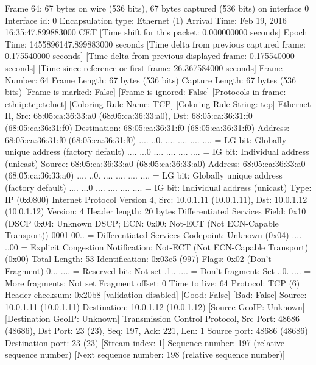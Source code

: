 Frame 64: 67 bytes on wire (536 bits), 67 bytes captured (536 bits) on interface 0
    Interface id: 0
    Encapsulation type: Ethernet (1)
    Arrival Time: Feb 19, 2016 16:35:47.899883000 CET
    [Time shift for this packet: 0.000000000 seconds]
    Epoch Time: 1455896147.899883000 seconds
    [Time delta from previous captured frame: 0.175540000 seconds]
    [Time delta from previous displayed frame: 0.175540000 seconds]
    [Time since reference or first frame: 26.367584000 seconds]
    Frame Number: 64
    Frame Length: 67 bytes (536 bits)
    Capture Length: 67 bytes (536 bits)
    [Frame is marked: False]
    [Frame is ignored: False]
    [Protocols in frame: eth:ip:tcp:telnet]
    [Coloring Rule Name: TCP]
    [Coloring Rule String: tcp]
Ethernet II, Src: 68:05:ca:36:33:a0 (68:05:ca:36:33:a0), Dst: 68:05:ca:36:31:f0 (68:05:ca:36:31:f0)
    Destination: 68:05:ca:36:31:f0 (68:05:ca:36:31:f0)
        Address: 68:05:ca:36:31:f0 (68:05:ca:36:31:f0)
        .... ..0. .... .... .... .... = LG bit: Globally unique address (factory default)
        .... ...0 .... .... .... .... = IG bit: Individual address (unicast)
    Source: 68:05:ca:36:33:a0 (68:05:ca:36:33:a0)
        Address: 68:05:ca:36:33:a0 (68:05:ca:36:33:a0)
        .... ..0. .... .... .... .... = LG bit: Globally unique address (factory default)
        .... ...0 .... .... .... .... = IG bit: Individual address (unicast)
    Type: IP (0x0800)
Internet Protocol Version 4, Src: 10.0.1.11 (10.0.1.11), Dst: 10.0.1.12 (10.0.1.12)
    Version: 4
    Header length: 20 bytes
    Differentiated Services Field: 0x10 (DSCP 0x04: Unknown DSCP; ECN: 0x00: Not-ECT (Not ECN-Capable Transport))
        0001 00.. = Differentiated Services Codepoint: Unknown (0x04)
        .... ..00 = Explicit Congestion Notification: Not-ECT (Not ECN-Capable Transport) (0x00)
    Total Length: 53
    Identification: 0x03e5 (997)
    Flags: 0x02 (Don't Fragment)
        0... .... = Reserved bit: Not set
        .1.. .... = Don't fragment: Set
        ..0. .... = More fragments: Not set
    Fragment offset: 0
    Time to live: 64
    Protocol: TCP (6)
    Header checksum: 0x20b8 [validation disabled]
        [Good: False]
        [Bad: False]
    Source: 10.0.1.11 (10.0.1.11)
    Destination: 10.0.1.12 (10.0.1.12)
    [Source GeoIP: Unknown]
    [Destination GeoIP: Unknown]
Transmission Control Protocol, Src Port: 48686 (48686), Dst Port: 23 (23), Seq: 197, Ack: 221, Len: 1
    Source port: 48686 (48686)
    Destination port: 23 (23)
    [Stream index: 1]
    Sequence number: 197    (relative sequence number)
    [Next sequence number: 198    (relative sequence number)]
